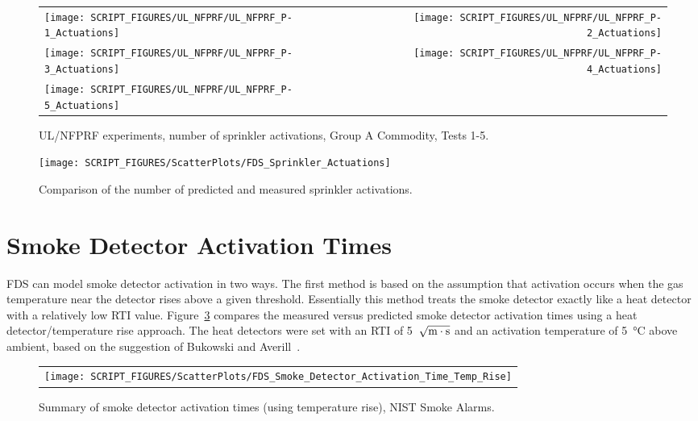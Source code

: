\begin{figure}[p]
\begin{tabular*}{\textwidth}{l@{\extracolsep{\fill}}r}
\texttt{[image: SCRIPT\_FIGURES/UL\_NFPRF/UL\_NFPRF\_P-1\_Actuations]} &
\texttt{[image: SCRIPT\_FIGURES/UL\_NFPRF/UL\_NFPRF\_P-2\_Actuations]} \\
\texttt{[image: SCRIPT\_FIGURES/UL\_NFPRF/UL\_NFPRF\_P-3\_Actuations]} &
\texttt{[image: SCRIPT\_FIGURES/UL\_NFPRF/UL\_NFPRF\_P-4\_Actuations]} \\
\texttt{[image: SCRIPT\_FIGURES/UL\_NFPRF/UL\_NFPRF\_P-5\_Actuations]} &
\end{tabular*}
\caption{UL/NFPRF experiments, number of sprinkler activations, Group A Commodity, Tests 1-5.}
\label{UL_NFPRF_3_1}
\end{figure}

\begin{figure}[p]
\begin{center}
\texttt{[image: SCRIPT\_FIGURES/ScatterPlots/FDS\_Sprinkler\_Actuations]}
\end{center}
\caption[Comparison of the number of predicted and measured sprinkler activations]
{Comparison of the number of predicted and measured sprinkler activations.}
\label{UL_NFPRF}
\end{figure}




\clearpage

\section{Smoke Detector Activation Times}
\label{Smoke Detector Activation Time}
\label{Smoke Detector Activation Time, Temp. Rise}

FDS can model smoke detector activation in two ways. The first method is based on the assumption that activation occurs when the gas temperature near the detector rises above a given threshold. Essentially this method treats the smoke detector exactly like a heat detector with a relatively low RTI value. Figure~\ref{NIST_Smoke_Alarms_Scatterplot_Temp_Rise} compares the measured versus predicted smoke detector activation times using a heat detector/temperature rise approach. The heat detectors were set with an RTI of 5~$\sqrt{\hbox{m}\cdot \hbox{s}}$ and an activation temperature of \SI{5}{\celsius} above ambient, based on the suggestion of Bukowski and Averill~\cite{Bukowski:2}.

\begin{figure}[!h]
\begin{center}
\begin{tabular}{c}
\texttt{[image: SCRIPT\_FIGURES/ScatterPlots/FDS\_Smoke\_Detector\_Activation\_Time\_Temp\_Rise]}
\end{tabular}
\end{center}
\caption[Summary of smoke detector activation times (temperature rise), NIST Smoke Alarms.]
{Summary of smoke detector activation times (using temperature rise), NIST Smoke Alarms.}
\label{NIST_Smoke_Alarms_Scatterplot_Temp_Rise}
\end{figure}

